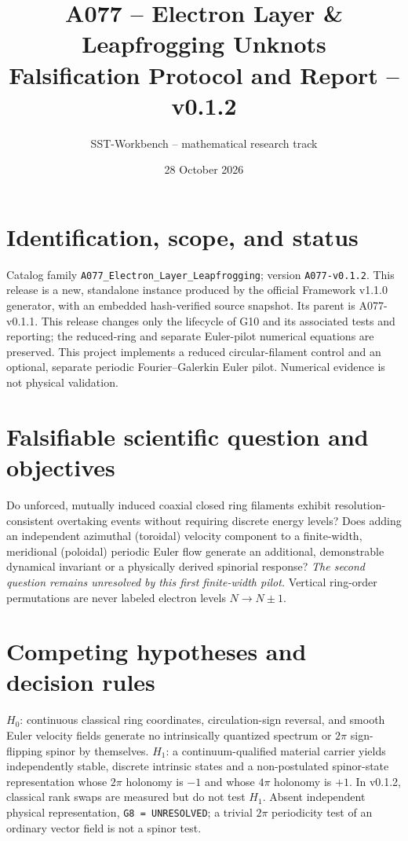 \documentclass[10pt,a4paper]{article}
\title{A077 -- Electron Layer \& Leapfrogging Unknots\\\large Falsification Protocol and Report -- v0.1.2}
\author{SST-Workbench -- mathematical research track}
\date{28 October 2026}
\begin{document}
\maketitle
\noindent{}

\section{Identification, scope, and status}
Catalog family \texttt{A077\_Electron\_Layer\_Leapfrogging}; version \texttt{A077-v0.1.2}. This release is a new, standalone instance produced by the official Framework v1.1.0 generator, with an embedded hash-verified source snapshot. Its parent is A077-v0.1.1. This release changes only the lifecycle of G10 and its associated tests and reporting; the reduced-ring and separate Euler-pilot numerical equations are preserved. This project implements a reduced circular-filament control and an optional, separate periodic Fourier--Galerkin Euler pilot. Numerical evidence is not physical validation.

\section{Falsifiable scientific question and objectives}
Do unforced, mutually induced coaxial closed ring filaments exhibit resolution-consistent overtaking events without requiring discrete energy levels? Does adding an independent azimuthal (toroidal) velocity component to a finite-width, meridional (poloidal) periodic Euler flow generate an additional, demonstrable dynamical invariant or a physically derived spinorial response? \emph{The second question remains unresolved by this first finite-width pilot.} Vertical ring-order permutations are never labeled electron levels $N\to N\pm1$.

\section{Competing hypotheses and decision rules}
$H_0$: continuous classical ring coordinates, circulation-sign reversal, and smooth Euler velocity fields generate no intrinsically quantized spectrum or $2\pi$ sign-flipping spinor by themselves. $H_1$: a continuum-qualified material carrier yields independently stable, discrete intrinsic states and a non-postulated spinor-state representation whose $2\pi$ holonomy is $-1$ and whose $4\pi$ holonomy is $+1$. In v0.1.2, classical rank swaps are measured but do not test $H_1$. Absent independent physical representation, \texttt{G8 = UNRESOLVED}; a trivial $2\pi$ periodicity test of an ordinary vector field is not a spinor test.
\end{document}
